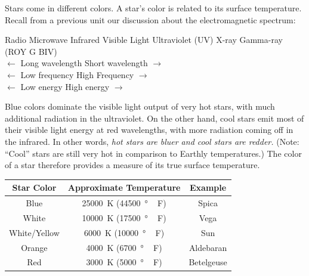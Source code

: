 \documentclass{article}
\numberwithin{equation}{section}
\numberwithin{figure}{section}
\begin{document}
\vspace{1em}

Stars come in different colors. A star's color is related to its surface temperature. Recall from a previous unit our discussion about the electromagnetic spectrum:
\vspace{1ex}

\begin{mdframed}[backgroundcolor=black!10]
\begin{center}
    Radio \hfill
    Microwave \hfill
    Infrared \hfill
    Visible Light \hfill
    Ultraviolet (UV) \hfill
    X-ray \hfill
    Gamma-ray\\
    \hspace{-10.5ex} (ROY G BIV)\\
    $\leftarrow$ Long wavelength \hfill Short wavelength $\rightarrow$\\
    $\leftarrow$ Low frequency \hfill 
    High Frequency $\rightarrow$\\
    $\leftarrow$ Low energy \hfill High energy $\rightarrow$
\end{center}
\end{mdframed}
\vspace{1ex}

Blue colors dominate the visible light output of very hot stars, with much additional radiation in the ultraviolet. On the other hand, cool stars emit most of their visible light energy at red wavelengths, with more radiation coming off in the infrared. In other words, \textit{hot stars are bluer and cool stars are redder.} (Note: ``Cool'' stars are still very hot in comparison to Earthly temperatures.) The color of a star therefore provides a measure of its true surface temperature. 

\begin{center}
\begin{tabular}{c|c|c}
    \hline
    \textbf{Star Color} & \textbf{Approximate Temperature} & \textbf{Example} \\
    \hline
     Blue & \SI{25000}{K} (\SI{44500}{\degree\,F}) & Spica\\
     White & \SI{10000}{K} (\SI{17500}{\degree\,F}) & Vega\\
     White/Yellow & \SI{6000}{K} (\SI{10000}{\degree\,F}) & Sun\\
     Orange & \SI{4000}{K} (\SI{6700}{\degree\,F}) & Aldebaran\\
     Red & \SI{3000}{K} (\SI{5000}{\degree\,F}) & Betelgeuse\\
     \hline
\end{tabular}
\end{center}
\end{document}
